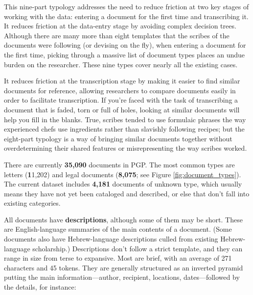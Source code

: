 \documentclass{article}
\def\totalDocuments{35,090}
\def\totalLetter{11,202}
\def\totalLegalDocument{8,075}
\def\totalUnknown{4,181}
\begin{document}
This nine-part typology addresses the need to reduce friction at two key stages of working with the data: entering a document for the first time and transcribing it. It reduces friction at the data-entry stage by avoiding complex decision trees. Although there are many more than eight templates that the scribes of the documents were following (or devising on the fly), when entering a document for the first time, picking through a massive list of document types places an undue burden on the researcher. These nine types cover nearly all the existing cases. 

It reduces friction at the transcription stage by making it easier to find similar documents for reference, allowing researchers to compare documents easily in order to facilitate transcription. If you’re faced with the task of transcribing a document that is faded, torn or full of holes, looking at similar documents will help you fill in the blanks. True, scribes tended to use formulaic phrases the way experienced chefs use ingredients rather than slavishly following recipes; but the eight-part typology is a way of bringing similar documents together without overdetermining their shared features or misrepresenting the way scribes worked.

There are currently \textbf{\totalDocuments} documents in PGP. The most common types are letters (\textbf\totalLetter) and legal documents (\textbf{\totalLegalDocument}; see Figure \ref{fig:document_types}). The current dataset includes \textbf{\totalUnknown} documents of unknown type, which usually means they have not yet been cataloged and described, or else that don’t fall into existing categories. 

All documents have \textbf{descriptions}, although some of them may be short. These are English-language summaries of the main contents of a document. (Some documents also have Hebrew-language descriptions culled from existing Hebrew-language scholarship.) Descriptions don’t follow a strict template, and they can range in size from terse to expansive. Most are brief, with an average of 271 characters and 45 tokens. They are generally structured as an inverted pyramid putting the main information—author, recipient, locations, dates—followed by the details, for instance: 
\end{document}
